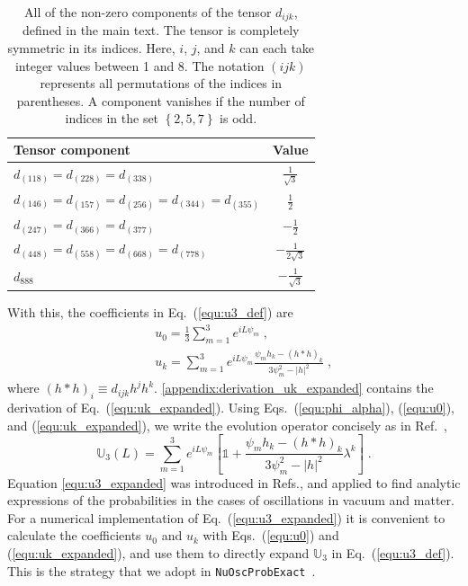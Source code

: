 \documentclass[final,5p,times,twocolumn]{elsarticle}
\newcommand{\eq}{Eq.}
\newcommand{\Ref}{Ref.}
\newcommand{\Refs}{Refs.}
\newcommand{\equ}[1]{\eq~(\ref{equ:#1})}
\begin{document}
{\def\arraystretch{1.2}
\begin{table}[t!]
  \begin{tabular}{lc}
   Tensor component & Value \\
   \hline
   $d_{(118)} = d_{(228)} = d_{(338)}$                         & $\frac{1}{\sqrt{3}}$ \\
   $d_{(146)} = d_{(157)} = d_{(256)} = d_{(344)} = d_{(355)}$ & $\frac{1}{2}$ \\
   $d_{(247)} = d_{(366)} = d_{(377)}$                         & $-\frac{1}{2}$ \\
   $d_{(448)} = d_{(558)} = d_{(668)} = d_{(778)}$             & $-\frac{1}{2\sqrt{3}}$ \\
   $d_{888}$                                                   & $-\frac{1}{\sqrt{3}}$
  \end{tabular}
  \caption{\label{tab:d_tensor}All of the non-zero components of the tensor $d_{ijk}$, defined in the main text.  The tensor is completely symmetric in its indices.  Here, $i$, $j$, and $k$ can each take integer values between 1 and 8.  The notation $\left( ijk \right)$ represents all permutations of the indices in parentheses.  A component vanishes if the number of indices in the set $\left\{ 2,5,7 \right\}$ is odd.}
\end{table}
}

With this, the coefficients in \equ{u3_def} are
\begin{eqnarray}
 && \label{equ:u0}
 u_0=\frac{1}{3}\sum_{m=1}^3 e^{i L \psi_m} \;, \\
 \label{equ:uk_expanded}
 && u_k
 =
 \sum_{m=1}^3
 e^{i L \psi_m} \frac{\psi_m h_k - \left(h \ast h\right)_k}{3\psi_m^2 - \left\vert h \right\vert^2} \;,
\end{eqnarray}
where $\left(h\ast h\right)_i \equiv d_{ijk}h^jh^k$.  \ref{appendix:derivation_uk_expanded} contains the derivation of \equ{uk_expanded}.  Using Eqs.\ (\ref{equ:phi_alpha}), (\ref{equ:u0}), and (\ref{equ:uk_expanded}), we write the evolution operator concisely as in \Ref\ \cite{Ohlsson:1999xb},
\begin{equation}
 \label{equ:u3_expanded}
 \mathbb{U}_3(L)
 =
 \sum_{m=1}^3
 e^{i L \psi_m}
 \left[
 \mathbb{1} 
 +
 \frac{\psi_m h_k - \left( h \ast h \right)_k}{3\psi_m^2-\lvert h \rvert^2} \lambda^k
 \right] \;.
\end{equation}
Equation \ref{equ:u3_expanded} was introduced in \Refs \cite{Ohlsson:1999xb, Ohlsson:1999um, Ohlsson:2000zz}, and applied to find analytic expressions of the probabilities in the cases of oscillations in vacuum and matter.  For a numerical implementation of \equ{u3_expanded} it is convenient to calculate the coefficients $u_0$ and $u_k$ with Eqs.\ (\ref{equ:u0}) and (\ref{equ:uk_expanded}), and use them to directly expand $\mathbb{U}_3$ in \equ{u3_def}.  This is the strategy that we adopt in {\tt NuOscProbExact}\ \cite{NuOscProbExact}.  
\end{document}
